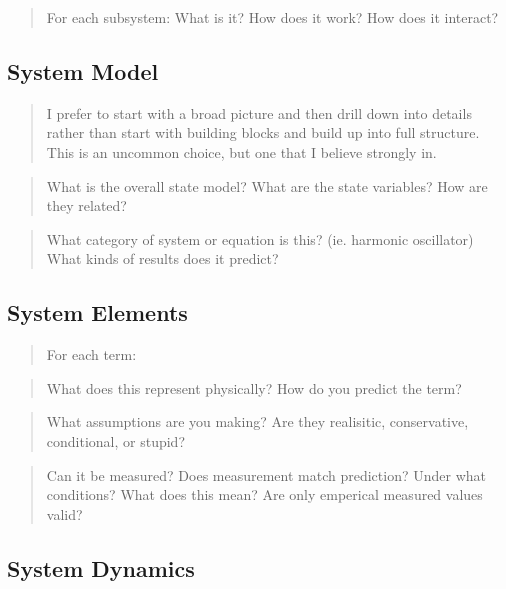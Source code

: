 \documentclass[
  10pt,
  draftcls,
  technote,
  letterpaper,
  oneside,
  onecolumn]{IEEEtran}
\begin{document}
\begin{quote}
For each subsystem: What is it? How does it work? How does it interact?
\end{quote}

\hypertarget{system-model}{%
\subsection{System Model}\label{system-model}}

\begin{quote}
I prefer to start with a broad picture and then drill down into details
rather than start with building blocks and build up into full structure.
This is an uncommon choice, but one that I believe strongly in.
\end{quote}

\begin{quote}
What is the overall state model? What are the state variables? How are
they related?
\end{quote}

\begin{quote}
What category of system or equation is this? (ie. harmonic oscillator)
What kinds of results does it predict?
\end{quote}

\hypertarget{system-elements}{%
\subsection{System Elements}\label{system-elements}}

\begin{quote}
For each term:
\end{quote}

\begin{quote}
What does this represent physically? How do you predict the term?
\end{quote}

\begin{quote}
What assumptions are you making? Are they realisitic, conservative,
conditional, or stupid?
\end{quote}

\begin{quote}
Can it be measured? Does measurement match prediction? Under what
conditions? What does this mean? Are only emperical measured values
valid?
\end{quote}

\hypertarget{system-dynamics}{%
\subsection{System Dynamics}\label{system-dynamics}}
\end{document}
